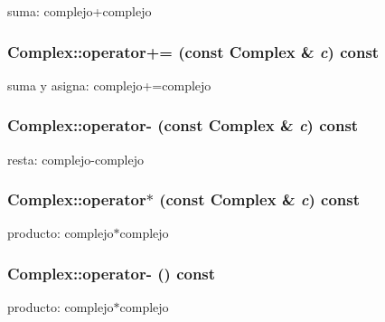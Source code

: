 suma: complejo+complejo 

\hypertarget{classComplex_f4fd1eb88e00915f3f3d51d1d3eeeb0b}{
\subsubsection{ Complex::operator+= (const {\bf Complex} \& {\em c}) const}}
\label{classComplex_f4fd1eb88e00915f3f3d51d1d3eeeb0b}


suma y asigna: complejo+=complejo 

\hypertarget{classComplex_9db6e1faaf7164c809d3567085b5c89f}{
\subsubsection{ Complex::operator- (const {\bf Complex} \& {\em c}) const}}
\label{classComplex_9db6e1faaf7164c809d3567085b5c89f}


resta: complejo-complejo 

\hypertarget{classComplex_86f4398baa4ea8b9b52c39ad66f0a763}{
\subsubsection{ Complex::operator$\ast$ (const {\bf Complex} \& {\em c}) const}}
\label{classComplex_86f4398baa4ea8b9b52c39ad66f0a763}


producto: complejo$\ast$complejo 

\hypertarget{classComplex_9a4a427e85873a2c7ffb2f0dd80e48bc}{
\subsubsection{ Complex::operator- () const}}
\label{classComplex_9a4a427e85873a2c7ffb2f0dd80e48bc}


producto: complejo$\ast$complejo 



